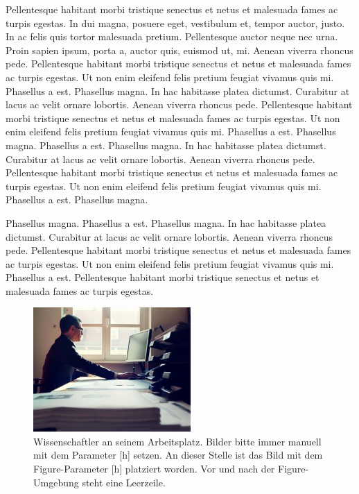Pellentesque habitant morbi tristique senectus et netus et malesuada fames ac turpis egestas. In dui magna, posuere eget, vestibulum et, tempor auctor, justo. In ac felis quis tortor malesuada pretium. Pellentesque auctor neque nec urna. Proin sapien ipsum, porta a, auctor quis, euismod ut, mi. Aenean viverra rhoncus pede. Pellentesque habitant morbi tristique senectus et netus et malesuada fames ac turpis egestas. Ut non enim eleifend felis pretium feugiat vivamus quis mi. Phasellus a est. Phasellus magna. In hac habitasse platea dictumst. Curabitur at lacus ac velit ornare lobortis. Aenean viverra rhoncus pede. Pellentesque habitant morbi tristique senectus et netus et malesuada fames ac turpis egestas. Ut non enim eleifend felis pretium feugiat vivamus quis mi. Phasellus a est. Phasellus magna. Phasellus a est. Phasellus magna. In hac habitasse platea dictumst. Curabitur at lacus ac velit ornare lobortis. Aenean viverra rhoncus pede. Pellentesque habitant morbi tristique senectus et netus et malesuada fames ac turpis egestas. Ut non enim eleifend felis pretium feugiat vivamus quis mi. Phasellus a est. Phasellus magna.

Phasellus magna. Phasellus a est. Phasellus magna. In hac habitasse platea dictumst. Curabitur at lacus ac velit ornare lobortis. Aenean viverra rhoncus pede. Pellentesque habitant morbi tristique senectus et netus et malesuada fames ac turpis egestas. Ut non enim eleifend felis pretium feugiat vivamus quis mi. Phasellus a est. Pellentesque habitant morbi tristique senectus et netus et malesuada fames ac turpis egestas.

\begin{figure}[h]
	\centering
	\includegraphics[width=6cm]{Abbildungen/wissen.jpg}
	\caption[Wissenschaftler an seinem Arbeitsplatz.]{Wissenschaftler an seinem Arbeitsplatz. Bilder bitte immer manuell mit dem Parameter [h] setzen. An dieser Stelle ist das Bild mit dem Figure-Parameter [h] platziert worden. Vor und nach der Figure-Umgebung steht eine Leerzeile.}
	\label{fig:wissen}
\end{figure}

